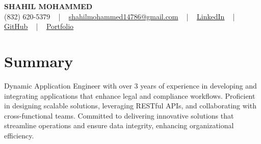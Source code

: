 \documentclass[letterpaper,10pt]{article}
\begin{document}
\begin{center}
    {\fontsize{14pt}{12pt}\selectfont \textbf{\MakeUppercase{Shahil Mohammed}}}\\ \vspace{2pt}
    \fontsize{10pt}{12pt}\selectfont (832) 620-5379 ~ | ~ \href{mailto:shahilmohammed14786@gmail.com}{shahilmohammed14786@gmail.com} ~ | ~  
    \href{https://www.linkedin.com/in/shahil-mohammed-9652931a1/}{\color{blue}\underline{LinkedIn}}  ~ | ~ 
    \href{https://github.com/freakbeast14}{\color{blue}\underline{GitHub}} ~ | ~ 
    \href{https://shahil-mohammed.netlify.app/}{\color{blue}\underline{Portfolio}}
    \vspace{-8pt}
\end{center}

\section{Summary}
\vspace{-2pt}\fontsize{8pt}{9pt}\selectfont
Dynamic Application Engineer with over 3 years of experience in developing and integrating applications that enhance legal and compliance workflows. Proficient in designing scalable solutions, leveraging RESTful APIs, and collaborating with cross-functional teams. Committed to delivering innovative solutions that streamline operations and ensure data integrity, enhancing organizational efficiency.

\vspace{-5pt}
 
\vspace{-2pt}
\end{document}
